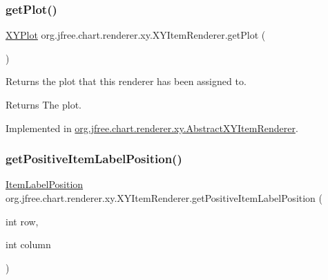 \subsubsection{\texorpdfstring{get\+Plot()}{getPlot()}}
{\footnotesize\ttfamily \mbox{\hyperlink{classorg_1_1jfree_1_1chart_1_1plot_1_1_x_y_plot}{X\+Y\+Plot}} org.\+jfree.\+chart.\+renderer.\+xy.\+X\+Y\+Item\+Renderer.\+get\+Plot (\begin{DoxyParamCaption}{ }\end{DoxyParamCaption})}

Returns the plot that this renderer has been assigned to.

\begin{DoxyReturn}{Returns}
The plot. 
\end{DoxyReturn}


Implemented in \mbox{\hyperlink{classorg_1_1jfree_1_1chart_1_1renderer_1_1xy_1_1_abstract_x_y_item_renderer_a1392aa3430b50260aecc9e0622c214c3}{org.\+jfree.\+chart.\+renderer.\+xy.\+Abstract\+X\+Y\+Item\+Renderer}}.

\mbox{\label{interfaceorg_1_1jfree_1_1chart_1_1renderer_1_1xy_1_1_x_y_item_renderer_ad33b91a9c40ec78db443444489cba3bf}} 
\subsubsection{\texorpdfstring{get\+Positive\+Item\+Label\+Position()}{getPositiveItemLabelPosition()}\hspace{0.1cm}{\footnotesize\ttfamily [1/2]}}
{\footnotesize\ttfamily \mbox{\hyperlink{classorg_1_1jfree_1_1chart_1_1labels_1_1_item_label_position}{Item\+Label\+Position}} org.\+jfree.\+chart.\+renderer.\+xy.\+X\+Y\+Item\+Renderer.\+get\+Positive\+Item\+Label\+Position (\begin{DoxyParamCaption}\item[{int}]{row,  }\item[{int}]{column }\end{DoxyParamCaption})}

